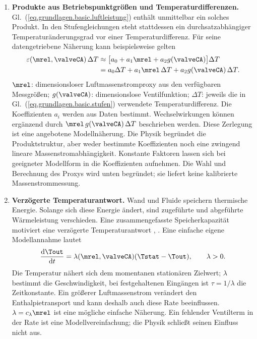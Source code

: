 \begin{enumerate}
  \item \textbf{Produkte aus Betriebspunktgrößen und Temperaturdifferenzen.}
    Gl.~(\ref{eq.grundlagen.basic.luftleistung}) enthält unmittelbar
    ein solches Produkt. In den Stufengleichungen steht stattdessen
    ein durchsatzabhängiger Temperaturänderungsgrad vor einer
    Temperaturdifferenz. Für seine datengetriebene Näherung kann
    beispielsweise gelten
    \begin{equation}
      \label{eq.grundlagen.basic.produkte}
      \begin{aligned}
        \varepsilon(\mrel,\valveCA)\,\Delta T
        &\approx
        \bigl[a_0+a_1\mrel+a_2g(\valveCA)\bigr]\Delta T\\
        &=a_0\Delta T+a_1\mrel\,\Delta T
                         +a_2g(\valveCA)\,\Delta T.
      \end{aligned}
    \end{equation}
    $\mrel$: dimensionsloser Luftmassenstromproxy aus den verfügbaren
    Messgrößen; $g(\valveCA)$: dimensionslose Ventilfunktion;
    $\Delta T$: jeweils die in Gl.~(\ref{eq.grundlagen.basic.stufen})
    verwendete Temperaturdifferenz. Die Koeffizienten $a_i$ werden
    aus Daten bestimmt. Wechselwirkungen können ergänzend durch
    $\mrel\,g(\valveCA)\,\Delta T$ beschrieben werden.
    Diese Zerlegung ist eine angebotene Modellnäherung. Die Physik
    begründet die Produktstruktur, aber weder bestimmte Koeffizienten
    noch eine zwingend lineare Massenstromabhängigkeit.
    Konstante Faktoren lassen sich bei geeigneter Modellform in die
    Koeffizienten aufnehmen. Die Wahl und Berechnung des Proxys wird
    unten begründet; sie liefert keine kalibrierte Massenstrommessung.

  \item \textbf{Verzögerte Temperaturantwort.}
    Wand und Fluide speichern thermische Energie. Solange sich diese
    Energie ändert, sind zugeführte und abgeführte Wärmeleistung
    verschieden. Eine zusammengefasste Speicherkapazität motiviert
    eine verzögerte Temperaturantwort
    \cite[S.~830--831, Gl.~31.36--31.38]{almbauerThermomanagement2019},
    \cite[S.~230, Gl.~4.6.14--4.6.16]{isermannEngineModelingControl2014}.
    Eine einfache eigene Modellannahme lautet
    \begin{equation}
      \label{eq.grundlagen.basic.dynamik}
      \frac{\mathrm d\Tout}{\mathrm dt}
       =\lambda(\mrel,\valveCA)(\Tstat-\Tout),
       \qquad \lambda>0.
    \end{equation}
    Die Temperatur nähert sich dem momentanen stationären Zielwert;
    $\lambda$ bestimmt die Geschwindigkeit, bei festgehaltenen
    Eingängen ist $\tau=1/\lambda$ die Zeitkonstante.
    Ein größerer Luftmassenstrom verändert den Enthalpietransport
    und kann deshalb auch diese Rate beeinflussen.
    $\lambda=c_\lambda\mrel$ ist eine mögliche einfache Näherung.
    Ein fehlender Ventilterm in der Rate ist eine Modellvereinfachung;
    die Physik schließt seinen Einfluss nicht aus.


\end{enumerate}
